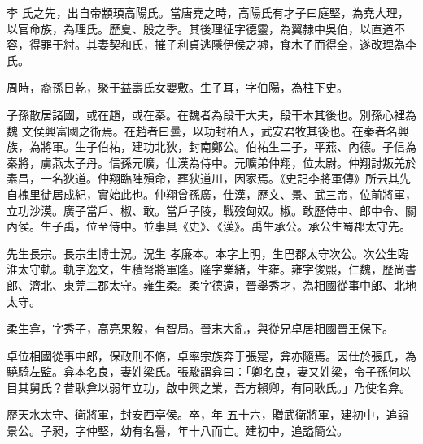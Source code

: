 
\begin{pinyinscope}

 李
 氏之先，出自帝顓頊高陽氏。當唐堯之時，高陽氏有才子曰庭堅，為堯大理，以官命族，為理氏。歷夏、殷之季。其後理征字德靈，為翼隸中吳伯，以直道不容，得罪于紂。其妻契和氏，摧子利貞逃隱伊侯之墟，食木子而得全，遂改理為李氏。



 周時，裔孫日乾，聚于益壽氏女嬰敷。生子耳，字伯陽，為柱下史。



 子孫散居諸國，或在趙，或在秦。在魏者為段干大夫，段干木其後也。別孫心裡為魏
 文侯興富國之術焉。在趙者曰曇，以功封柏人，武安君牧其後也。在秦者名興族，為將軍。生子伯祐，建功北狄，封南鄭公。伯祐生二子，平燕、內德。子信為秦將，虜燕太子丹。信孫元曠，仕漢為侍中。元曠弟仲翔，位太尉。仲翔討叛羌於素昌，一名狄道。仲翔臨陣殞命，葬狄道川，因家焉。《史記李將軍傳》所云其先自槐里徙居成紀，實始此也。仲翔曾孫廣，仕漢，歷文、景、武三帝，位前將軍，立功沙漠。廣子當戶、椒、敢。當戶子陵，戰歿匈奴。椒。敢歷侍中、郎中令、關內侯。生子禹，位至侍中。並事具《史》、《漢》。禹生承公。承公生蜀郡太守先。



 先生長宗。長宗生博士況。況生
 孝廉本。本字上明，生巴郡太守次公。次公生臨淮太守軌。軌字逸文，生積弩將軍隆。隆字業緒，生雍。雍字俊熙，仁魏，歷尚書郎、濟北、東莞二郡太守。雍生柔。柔字德遠，晉舉秀才，為相國從事中郎、北地太守。



 柔生弇，字秀子，高亮果毅，有智局。晉末大亂，與從兄卓居相國晉王保下。



 卓位相國從事中郎，保政刑不脩，卓率宗族奔于張寔，弇亦隨焉。因仕於張氏，為驍騎左監。弇本名良，妻姓梁氏。張駿謂弇曰：「卿名良，妻又姓梁，令子孫何以目其舅氏？昔耿弇以弱年立功，啟中興之業，吾方賴卿，有同耿氏。」乃使名弇。



 歷天水太守、衛將軍，封安西亭侯。卒，年
 五十六，贈武衛將軍，建初中，追謚景公。子昶，字仲堅，幼有名譽，年十八而亡。建初中，追謚簡公。




\end{pinyinscope}
